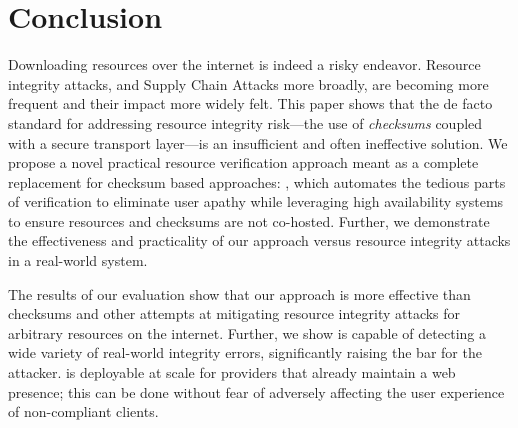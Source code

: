 \section{Conclusion} \label{sec:conclusion}


Downloading resources over the internet is indeed a risky endeavor. Resource
integrity attacks, and Supply Chain Attacks more broadly, are becoming more
frequent and their impact more widely felt. This paper shows that the de facto
standard for addressing resource integrity risk---the use of \emph{checksums}
coupled with a secure transport layer---is an insufficient and often ineffective
solution. We propose a novel practical resource verification approach meant as a
complete replacement for checksum based approaches: \SYSTEM{}, which automates
the tedious parts of verification to eliminate user apathy while leveraging high
availability systems to ensure resources and checksums are not co-hosted.
Further, we demonstrate the effectiveness and practicality of our approach
versus resource integrity attacks in a real-world system.

The results of our evaluation show that our approach is more effective than
checksums and other attempts at mitigating resource integrity attacks for
arbitrary resources on the internet. Further, we show \SYSTEM{} is capable of
detecting a wide variety of real-world integrity errors, significantly raising
the bar for the attacker. \SYSTEM{} is deployable at scale for providers that
already maintain a web presence; this can be done without fear of adversely
affecting the user experience of non-compliant clients.
